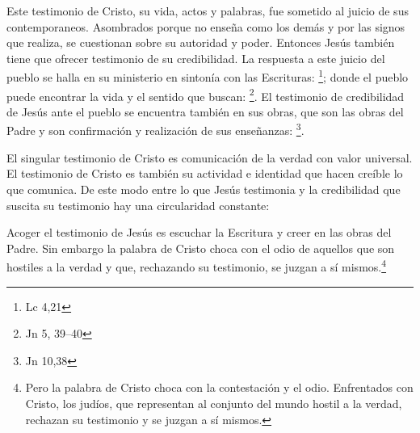 Este testimonio de Cristo, su vida, actos y palabras, fue sometido al juicio de
sus contemporaneos. Asombrados porque no enseña como los demás y por las signos
que realiza, se cuestionan sobre su autoridad y poder. Entonces Jesús también
tiene que ofrecer testimonio de su credibilidad. La respuesta a este juicio del
pueblo se halla en su ministerio en sintonía con las Escrituras:
\footnote{Lc 4,21}; donde el pueblo puede encontrar la vida y el sentido
que buscan: \footnote{Jn 5, 39--40}. El testimonio de
credibilidad de Jesús ante el pueblo se encuentra también en sus obras, que son
las obras del Padre y son confirmación y realización de sus enseñanzas:
\footnote{Jn 10,38}.

El singular testimonio de Cristo es comunicación de la verdad con valor
universal. El testimonio de Cristo es también su actividad e identidad que hacen
creíble lo que comunica. De este modo entre lo que Jesús testimonia y la
credibilidad que suscita su testimonio hay una circularidad constante:

Acoger el testimonio de Jesús es escuchar la Escritura y creer en las obras del
Padre. Sin embargo la palabra de Cristo choca con el odio de aquellos que son
hostiles a la verdad y que, rechazando su testimonio, se juzgan a sí
mismos.\footnote{Pero la palabra de Cristo choca con la contestación y el odio.
  Enfrentados con Cristo, los judíos, que representan al conjunto del mundo
  hostil a la verdad, rechazan su testimonio y se juzgan a sí
  mismos.\autocite[1530]{latourelle2000testimonio}} 

